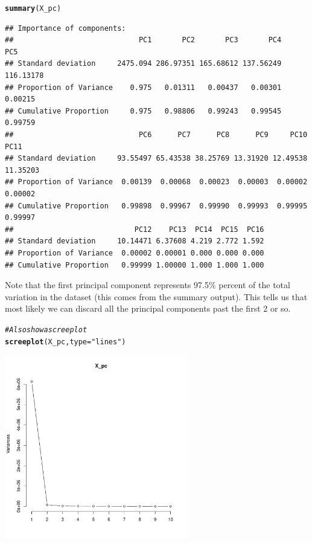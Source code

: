 \documentclass{article}\usepackage[]{graphicx}\usepackage[]{color}
\makeatletter
\newcommand{\hlstr}[1]{\textcolor[rgb]{0.192,0.494,0.8}{#1}}%
\newcommand{\hlcom}[1]{\textcolor[rgb]{0.678,0.584,0.686}{\textit{#1}}}%
\newcommand{\hlstd}[1]{\textcolor[rgb]{0.345,0.345,0.345}{#1}}%
\newcommand{\hlkwc}[1]{\textcolor[rgb]{0.333,0.667,0.333}{#1}}%
\newcommand{\hlkwd}[1]{\textcolor[rgb]{0.737,0.353,0.396}{\textbf{#1}}}%
\newenvironment{kframe}{%
 \def\at@end@of@kframe{}%
 \ifinner\ifhmode%
  \def\at@end@of@kframe{\end{minipage}}%
  \begin{minipage}{\columnwidth}%
 \fi\fi%
 \def\FrameCommand##1{\hskip\@totalleftmargin \hskip-\fboxsep
 \colorbox{shadecolor}{##1}\hskip-\fboxsep
     \hskip-\linewidth \hskip-\@totalleftmargin \hskip\columnwidth}%
 \MakeFramed {\advance\hsize-\width
   \@totalleftmargin\z@ \linewidth\hsize
   \@setminipage}}%
 {\par\unskip\endMakeFramed%
 \at@end@of@kframe}
\newenvironment{knitrout}{}{} %
\makeatother
\begin{document}
\begin{knitrout}
\begin{kframe}
\begin{alltt}
\hlkwd{summary}\hlstd{(X_pc)}
\end{alltt}
\begin{verbatim}
## Importance of components:
##                             PC1       PC2       PC3       PC4       PC5
## Standard deviation     2475.094 286.97351 165.68612 137.56249 116.13178
## Proportion of Variance    0.975   0.01311   0.00437   0.00301   0.00215
## Cumulative Proportion     0.975   0.98806   0.99243   0.99545   0.99759
##                             PC6      PC7      PC8      PC9     PC10     PC11
## Standard deviation     93.55497 65.43538 38.25769 13.31920 12.49538 11.35203
## Proportion of Variance  0.00139  0.00068  0.00023  0.00003  0.00002  0.00002
## Cumulative Proportion   0.99898  0.99967  0.99990  0.99993  0.99995  0.99997
##                            PC12    PC13  PC14  PC15  PC16
## Standard deviation     10.14471 6.37608 4.219 2.772 1.592
## Proportion of Variance  0.00002 0.00001 0.000 0.000 0.000
## Cumulative Proportion   0.99999 1.00000 1.000 1.000 1.000
\end{verbatim}
\end{kframe}
\end{knitrout}

Note that the first principal component represents 97.5\% percent of the total variation in the dataset (this comes from the summary output). This tells us that most likely we can discard all the principal components past the first 2 or so.

\begin{knitrout}
\color{fgcolor}\begin{kframe}
\begin{alltt}
\hlcom{# Also show a scree plot}
\hlkwd{screeplot}\hlstd{(X_pc,} \hlkwc{type} \hlstd{=} \hlstr{"lines"}\hlstd{)}
\end{alltt}
\end{kframe}

{\centering \includegraphics[width=0.6\textwidth]{figure/unnamed-chunk-3-1} 

}



\end{knitrout}
\end{document}
